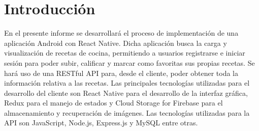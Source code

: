 \section{Introducción}
En el presente informe se desarrollará el proceso de implementación de una aplicación Android con React Native. Dicha aplicación busca la carga y visualización de recetas de cocina, permitiendo a usuarios registrarse e iniciar sesión para poder subir, calificar y marcar como favoritas sus propias recetas. Se hará uso de una RESTful API para, desde el cliente, poder obtener toda la información relativa a las recetas. Las principales tecnologías utilizadas para el desarrollo del cliente son React Native para el desarrollo de la interfaz gráfica, Redux para el manejo de estados y Cloud Storage for Firebase para el almacenamiento y recuperación de imágenes. Las tecnologías utilizadas para la API son JavaScript, Node.js, Express.js y MySQL entre otras.